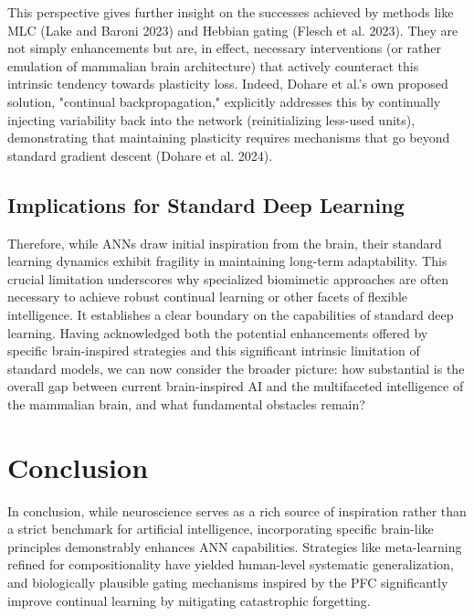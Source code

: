 \documentclass[
10pt, %
a4paper, %
oneside, %
headinclude,footinclude, %
BCOR5mm, %
]{scrartcl}
\begin{document}
This perspective gives further insight on the successes achieved by methods like MLC (Lake and Baroni 2023) and Hebbian gating (Flesch et al. 2023). They are not simply enhancements but are, in effect, necessary interventions (or rather emulation of mammalian brain architecture) that actively counteract this intrinsic tendency towards plasticity loss. Indeed, Dohare et al.'s own proposed solution, "continual backpropagation," explicitly addresses this by continually injecting variability back into the network (reinitializing less-used units), demonstrating that maintaining plasticity requires mechanisms that go beyond standard gradient descent (Dohare et al. 2024).

\subsection{Implications for Standard Deep Learning}

Therefore, while ANNs draw initial inspiration from the brain, their standard learning dynamics exhibit fragility in maintaining long-term adaptability. This crucial limitation underscores why specialized biomimetic approaches are often necessary to achieve robust continual learning or other facets of flexible intelligence. It establishes a clear boundary on the capabilities of standard deep learning. Having acknowledged both the potential enhancements offered by specific brain-inspired strategies and this significant intrinsic limitation of standard models, we can now consider the broader picture: how substantial is the overall gap between current brain-inspired AI and the multifaceted intelligence of the mammalian brain, and what fundamental obstacles remain?

\section{Conclusion}

In conclusion, while neuroscience serves as a rich source of inspiration rather than a strict benchmark for artificial intelligence, incorporating specific brain-like principles demonstrably enhances ANN capabilities. Strategies like meta-learning refined for compositionality have yielded human-level systematic generalization, and biologically plausible gating mechanisms inspired by the PFC significantly improve continual learning by mitigating catastrophic forgetting. 
\end{document}
